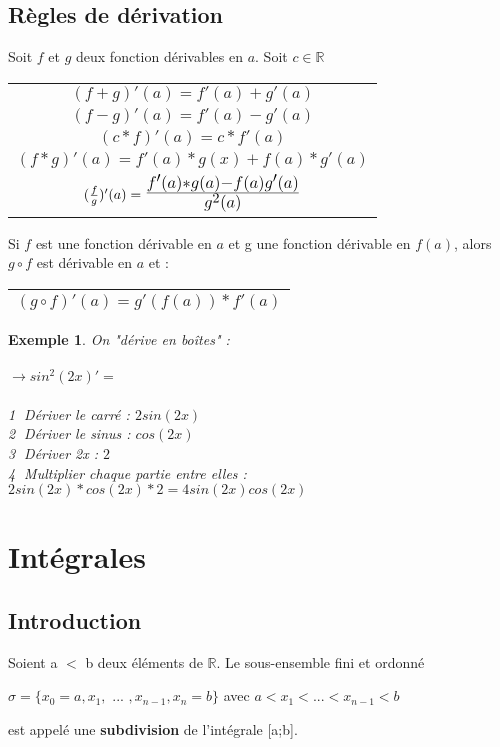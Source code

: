 \documentclass[12pt, a4paper]{book}
\newtheorem*{exemple}{Exemple}
\def\mathLarge#1{\mbox{\LARGE $#1$}}
\begin{document}
\subsection{Règles de dérivation}
Soit $f$ et $g$ deux fonction dérivables en $a$. Soit $c \in \mathbb{R}$\\
\begin{center}
\begin{tabular}{ |c|}
    \hline
    $(f+g)'(a) = f'(a) + g'(a)$\\
    $(f-g)'(a) = f'(a) - g'(a)$\\
    $(c*f)'(a) = c*f'(a)$\\
    $(f*g)'(a) = f'(a)*g(x) + f(a)*g'(a)$\\
    $(\frac{f}{g})'(a) = \mathLarge{\frac{f'(a)*g(a) - f(a)g'(a)}{g^2(a)}}$\\
    \hline
\end{tabular}
\end{center}

Si $f$ est une fonction dérivable en $a$ et g une fonction dérivable en $f(a)$, alors $g \circ f$ est dérivable en $a$ et :\\
\begin{center}
    \begin{tabular}{ |c|}
        \hline
        $(g \circ f)'(a) = g'(f(a)) * f'(a)$\\
        \hline
    \end{tabular}
    \end{center}
\begin{exemple}
    On "dérive en boîtes" :\\
    \newline \\
    $\rightarrow sin^{2}(2x)' =$\\
    \newline \\
    \textcircled{1} Dériver le carré : $2sin(2x)$\\
    \textcircled{2} Dériver le sinus : $cos(2x)$\\
    \textcircled{3} Dériver 2x : $2$\\
    \textcircled{4} Multiplier chaque partie entre elles :$2sin(2x)*cos(2x)*2 = 4sin(2x)cos(2x)$\\
\end{exemple}
\newpage
\section{Intégrales}
\subsection{Introduction}
Soient a $<$ b deux éléments de $\mathbb{R}$. Le sous-ensemble fini et ordonné
\begin{center}
    $\sigma = \{x_0 = a, x_1,$ ... $,x_{n-1},x_n =b\}$ avec $a < x_1< ... < x_{n-1} < b $
\end{center}
est appelé une \textbf{subdivision} de l'intégrale [a;b].
\end{document}
